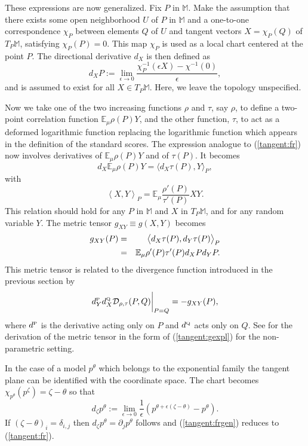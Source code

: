 \documentclass[graybox]{svmult}
\newcommand{\be}{\begin{equation}}
\newcommand{\ee}{\end{equation}}
\newcommand{\beq}{\begin{eqnarray}}
\newcommand{\eeq}{\end{eqnarray}}
\newcommand{\Mo}{\mathbb M}
\newcommand{\Eo}{\mathbb E}
\newcommand{\Ddiv}{\mathcal{D}}
\newcommand{\Dfrechet}{d}
\begin{document}
These expressions are now generalized.
Fix $P$ in $\Mo$.
Make the assumption that there exists some open neighborhood $U$ of $P$ in $\Mo$
and a one-to-one correspondence $\chi_P$ between elements $Q$ of $U$ and tangent vectors $X=\chi_P(Q)$ of $T_P\Mo$,
satisfying $\chi_P(P)=0$.
This map $\chi_P$ is used as a local chart centered at the point $P$.
The directional derivative $\Dfrechet_X$ is then defined as
$$\Dfrechet_X  P := \lim_{\epsilon \rightarrow 0}  \frac{\chi_P^{-1}(\epsilon X)-\chi^{-1}(0)}{\epsilon},$$
and is assumed to exist for all $X\in T_P\Mo$. Here, we leave the topology unspecified.




Now we take one of the two increasing functions $\rho$ and $\tau$, say $\rho$, to define a two-point
correlation function $\Eo_\mu\rho(P)Y$, and the other function, $\tau$, 
to act as a deformed logarithmic function replacing
the logarithmic function which appears in the definition of the standard scores.
The expression analogue to (\ref{tangent:fr}) now
involves  derivatives of $\Eo_\mu\rho(P) Y$ and of $\tau(P)$. It becomes
\be
\Dfrechet_X\Eo_\mu\rho(P) Y=\big\langle \Dfrechet_X\tau(P),Y\big\rangle_P,
\label{tangent:frgen}
\ee
with
\be
\left\langle X,Y\right\rangle_P=\Eo_\mu\frac{\rho'(P)}{\tau'(P)}XY.
\nonumber
\ee
This relation should hold for any $P$ in $\Mo$ and $X$ in $T_P\Mo$, and for any random variable $Y$. 
The metric tensor $g_{XY} \equiv g(X,Y)$ becomes
\beq
g_{XY}(P)
&=&\big\langle \Dfrechet_X\tau(P),\Dfrechet_Y\tau(P)\big\rangle_P\cr
&=&\Eo_\mu\rho'(P)\tau'(P)\Dfrechet_X P\Dfrechet_Y P.
\label{tangent:gexpl}
\eeq
This metric tensor is related to the divergence function introduced in the previous
section by
\be
\Dfrechet^{\mbox{\tiny P}}_Y\Dfrechet^{\mbox{\tiny Q}}_X \Ddiv _{\rho,\tau}(P,Q)
\bigg|_{P=Q}
=-g_{XY}(P),
\nonumber
\ee
where $\Dfrechet^{\mbox{\tiny P}}$ is the derivative acting only on $P$ and 
$\Dfrechet^{\mbox{\tiny Q}}$ acts only on $Q$. 
See \cite{zhang13} for the derivation of the metric tensor in the form of
(\ref{tangent:gexpl})
for the non-parametric setting. 


In the case of a model $p^\theta$
which belongs to the exponential family the tangent plane can be identified with
the coordinate space. The chart becomes $\chi_{p^\theta}(p^\zeta)=\zeta-\theta$ 
so that
$$d_\zeta p^\theta := \lim_{\epsilon \rightarrow 0}\frac 1\epsilon
\left(p^{\theta+\epsilon(\zeta-\theta)}-p^\theta\right).$$
If $(\zeta-\theta)_i=\delta_{i,j}$ then $d_\zeta p^\theta=\partial_jp^\theta$ follows and 
(\ref {tangent:frgen}) reduces to (\ref {tangent:fr}).
\end{document}
